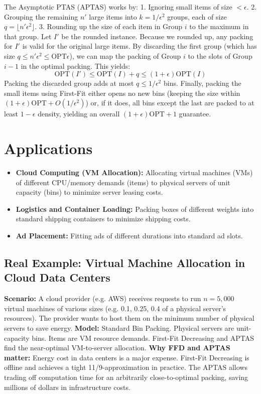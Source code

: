 \documentclass[11pt,oneside]{book}
\begin{document}
The Asymptotic PTAS (APTAS) works by:
1.  Ignoring small items of size $< \epsilon$.
2.  Grouping the remaining $n'$ large items into $k = 1/\epsilon^2$ groups, each of size $q = \lfloor n'\epsilon^2 \rfloor$.
3.  Rounding up the size of each item in Group $i$ to the maximum in that group.
Let $I'$ be the rounded instance. Because we rounded up, any packing for $I'$ is valid for the original large items. By discarding the first group (which has size $q \le n'\epsilon^2 \le \text{OPT}\epsilon$), we can map the packing of Group $i$ to the slots of Group $i-1$ in the optimal packing. This yields:
\[
\text{OPT}(I') \le \text{OPT}(I) + q \le (1 + \epsilon)\text{OPT}(I)
\]
Packing the discarded group adds at most $q \le 1/\epsilon^2$ bins. Finally, packing the small items using First-Fit either opens no new bins (keeping the size within $(1+\epsilon)\text{OPT} + O(1/\epsilon^2)$) or, if it does, all bins except the last are packed to at least $1-\epsilon$ density, yielding an overall $(1+\epsilon)\text{OPT} + 1$ guarantee.

\section{Applications}
\begin{itemize}
    \item \textbf{Cloud Computing (VM Allocation):} Allocating virtual machines (VMs) of different CPU/memory demands (items) to physical servers of unit capacity (bins) to minimize server leasing costs.
    \item \textbf{Logistics and Container Loading:} Packing boxes of different weights into standard shipping containers to minimize shipping costs.
    \item \textbf{Ad Placement:} Fitting ads of different durations into standard ad slots.
\end{itemize}

\subsection*{Real Example: Virtual Machine Allocation in Cloud Data Centers}
\textbf{Scenario:} A cloud provider (e.g. AWS) receives requests to run $n=5,000$ virtual machines of various sizes (e.g. 0.1, 0.25, 0.4 of a physical server's resources). The provider wants to host them on the minimum number of physical servers to save energy.
\textbf{Model:} Standard Bin Packing. Physical servers are unit-capacity bins. Items are VM resource demands. First-Fit Decreasing and APTAS find the near-optimal VM-to-server allocation.
\textbf{Why FFD and APTAS matter:} Energy cost in data centers is a major expense. First-Fit Decreasing is offline and achieves a tight 11/9-approximation in practice. The APTAS allows trading off computation time for an arbitrarily close-to-optimal packing, saving millions of dollars in infrastructure costs.
\end{document}
